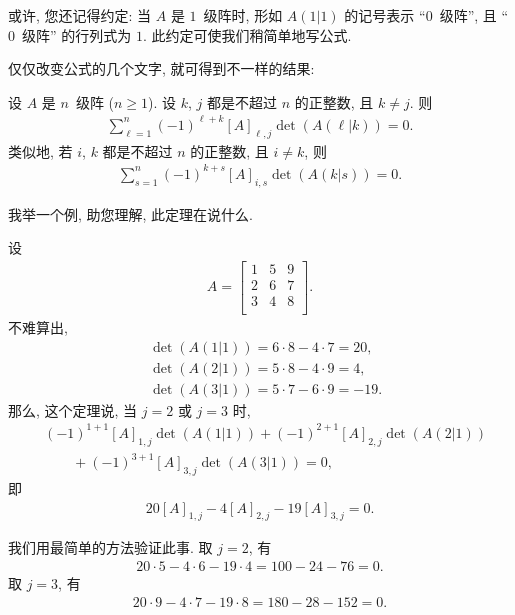 \documentclass[%
    UTF8,%
    fontset=none,%
    punct=kaiming,%
    zihao=-4,%
    a4paper,%
    oneside,%
]{ctexbook}
\renewcommand*{\geq}{\geqslant}
\begin{document}
\TheoremExpansionAboutAnyColumn*

\TheoremExpansionAboutAnyRow*

或许, 您还记得约定:
当 \(A\) 是 \(1\)~级阵时,
形如 \(A(1|1)\) 的记号表示 ``\(0\)~级阵'',
且 ``\(0\)~级阵'' 的行列式为 \(1\).
此约定可使我们稍简单地写公式.

仅仅改变公式的几个文字,
就可得到不一样的结果:

\begin{theorem}
    设 \(A\) 是 \(n\)~级阵 (\(n \geq 1\)).
    设 \(k\), \(j\) 都是不超过 \(n\) 的正整数,
    且 \(k \neq j\).
    则
    \begin{align*}
        \sum_{\ell = 1}^{n}
        {(-1)^{\ell+k} [A]_{\ell,j} \det {(A(\ell|k))}}
        = 0.
    \end{align*}
    类似地, 若 \(i\), \(k\) 都是不超过 \(n\) 的正整数,
    且 \(i \neq k\),
    则
    \begin{align*}
        \sum_{s = 1}^{n}
        {(-1)^{k+s} [A]_{i,s} \det {(A(k|s))}}
        = 0.
    \end{align*}
\end{theorem}

我举一个例, 助您理解, 此定理在说什么.

\begin{example}
    设
    \begin{align*}
        A =
        \begin{bmatrix}
            1 & 5 & 9 \\
            2 & 6 & 7 \\
            3 & 4 & 8 \\
        \end{bmatrix}.
    \end{align*}
    不难算出,
    \begin{align*}
         & \det {(A(1|1))} = 6 \cdot 8 - 4 \cdot 7 = 20,  \\
         & \det {(A(2|1))} = 5 \cdot 8 - 4 \cdot 9 = 4,   \\
         & \det {(A(3|1))} = 5 \cdot 7 - 6 \cdot 9 = -19.
    \end{align*}
    那么, 这个定理说, 当 \(j = 2\) 或 \(j = 3\) 时,
    \begin{align*}
         & (-1)^{1+1} [A]_{1,j} \det {(A(1|1))}
        + (-1)^{2+1} [A]_{2,j} \det {(A(2|1))}
        \\
         & \quad \quad
        + (-1)^{3+1} [A]_{3,j} \det {(A(3|1))} = 0,
    \end{align*}
    即
    \begin{align*}
        20 [A]_{1,j} - 4 [A]_{2,j} - 19 [A]_{3,j} = 0.
    \end{align*}

    我们用最简单的方法验证此事.
    取 \(j = 2\), 有
    \begin{align*}
        20 \cdot 5 - 4 \cdot 6 - 19 \cdot 4 = 100 - 24 - 76 = 0.
    \end{align*}
    取 \(j = 3\), 有
    \begin{align*}
        20 \cdot 9 - 4 \cdot 7 - 19 \cdot 8 = 180 - 28 - 152 = 0.
    \end{align*}
\end{example}
\end{document}
